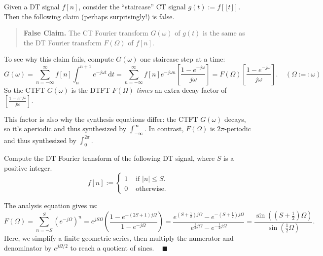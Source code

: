 \begin{remark}
    Given a DT signal $f[n]$, consider the ``staircase'' CT signal $g(t) := f[\lfloor t \rfloor]$.
    Then the following claim (perhaps surprisingly!) is false.
    \begin{quote}
        \textbf{False Claim.} The CT Fourier transform $G(\omega)$ of $g(t)$ is the same as
        the DT Fourier transform $F(\Omega)$ of $f[n]$.
    \end{quote}
    To see why this claim fails, compute $G(\omega)$ one staircase step at a time:
    \[ G(\omega) = \sum_{n = -\infty}^{\infty} f[n] \int_{n}^{n + 1} e^{-j \omega t} \, \mathrm{d}t
    = \sum_{n = -\infty}^{\infty} f[n] e^{-j \omega n} \left[ \frac{1 - e^{-j\omega}}{j\omega} \right]
    = F(\Omega) \left[ \frac{1 - e^{-j\omega}}{j\omega} \right].
    ~~~~~ (\Omega :=: \omega) \]
    So the CTFT $G(\omega)$ is the DTFT $F(\Omega)$ \emph{times} an extra decay factor of
    $\left[\frac{1 - e^{-j\omega}}{j\omega}\right]$.

    This factor is also why the synthesis equations differ:
    the CTFT $G(\omega)$ decays, so it's aperiodic and thus synthesized by $\int_{-\infty}^{\infty}$.
    In contrast, $F(\Omega)$ is $2\pi$-periodic and thus synthesized by $\int_0^{2\pi}$.
\end{remark}

\begin{problem}
    Compute the DT Fourier transform of the following DT signal, where $S$ is a positive integer.
    \[ f[n] := \begin{cases}
    1 & \text{ if } |n| \leq S. \\
    0 & \text{ otherwise.}
    \end{cases}\]
\end{problem}

\begin{solution}
    The analysis equation gives us:
    \[ F(\Omega) = \sum_{n = -S}^{S} \left(e^{-j\Omega}\right)^n
    = e^{jS\Omega} \left(\frac{1 - e^{- (2S + 1)j\Omega}}{1 - e^{-j \Omega}}\right)
    = \frac{
        e^{(S + \frac{1}{2})j \Omega} - e^{-(S + \frac{1}{2})j \Omega}
    }{
        e^{\frac{1}{2}j \Omega} - e^{-\frac{1}{2}j \Omega}
    } = \frac{\sin\left(\left(S + \frac{1}{2}\right)\Omega\right)}{\sin\left(\frac{1}{2}\Omega\right)}. \]
    Here, we simplify a finite geometric series,
    then multiply the numerator and denominator by $e^{j \Omega / 2}$
    to reach a quotient of sines. ~ $\blacksquare$
\end{solution}

